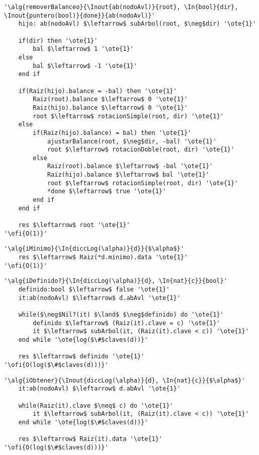 \begin{lstlisting}[mathescape]
'\alg{removerBalanceo}{\Inout{ab(nodoAvl)}{root}, \In{bool}{dir}, \Inout{puntero(bool)}{done}}{ab(nodoAvl)}'
	hijo: ab(nodoAvl) $\leftarrow$ subArbol(root, $\neg$dir) '\ote{1}'

	if(dir) then '\ote{1}'
		bal $\leftarrow$ 1 '\ote{1}'
	else
		bal $\leftarrow$ -1 '\ote{1}'
	end if

	if(Raiz(hijo).balance = -bal) then '\ote{1}'
		Raiz(root).balance $\leftarrow$ 0 '\ote{1}'
		Raiz(hijo).balance $\leftarrow$ 0 '\ote{1}'
		root $\leftarrow$ rotacionSimple(root, dir) '\ote{1}'
	else
		if(Raiz(hijo).balance) = bal) then '\ote{1}'
			ajustarBalance(root, $\neg$dir, -bal) '\ote{1}'
			root $\leftarrow$ rotacionDoble(root, dir) '\ote{1}'
		else
			Raiz(root).balance $\leftarrow$ -bal '\ote{1}'
			Raiz(hijo).balance $\leftarrow$ bal '\ote{1}'
			root $\leftarrow$ rotacionSimple(root, dir) '\ote{1}'
			*done $\leftarrow$ true '\ote{1}'
		end if
	end if

	res $\leftarrow$ root '\ote{1}'
'\ofi{O(1)}'
\end{lstlisting}

\begin{lstlisting}[mathescape]
'\alg{iMínimo}{\In{diccLog(\alpha)}{d}}{$\alpha$}'
	res $\leftarrow$ Raiz(*d.minimo).data '\ote{1}'
'\ofi{O(1)}'
\end{lstlisting}

\begin{lstlisting}[mathescape]
'\alg{iDefinido?}{\In{diccLog(\alpha)}{d}, \In{nat}{c}}{bool}'
	definido:bool $\leftarrow$ false '\ote{1}'
	it:ab(nodoAvl) $\leftarrow$ d.abAvl '\ote{1}'

	while($\neg$Nil?(it) $\land$ $\neg$definido) do '\ote{1}'
		definido $\leftarrow$ (Raiz(it).clave = c) '\ote{1}'
		it $\leftarrow$ subArbol(it, (Raiz(it).clave < c)) '\ote{1}'
	end while '\ote{log($\#$claves(d))}'

	res $\leftarrow$ definido '\ote{1}'
'\ofi{O(log($\#$claves(d)))}'
\end{lstlisting}

\begin{lstlisting}[mathescape]
'\alg{iObtener}{\Inout{diccLog(\alpha)}{d}, \In{nat}{c}}{$\alpha$}'
	it:ab(nodoAvl) $\leftarrow$ d.abAvl '\ote{1}'

	while(Raiz(it).clave $\neq$ c) do '\ote{1}'
		it $\leftarrow$ subArbol(it, (Raiz(it).clave < c)) '\ote{1}'
	end while '\ote{log($\#$claves(d))}'

	res $\leftarrow$ Raiz(it).data '\ote{1}'
'\ofi{O(log($\#$claves(d)))}'
\end{lstlisting}

